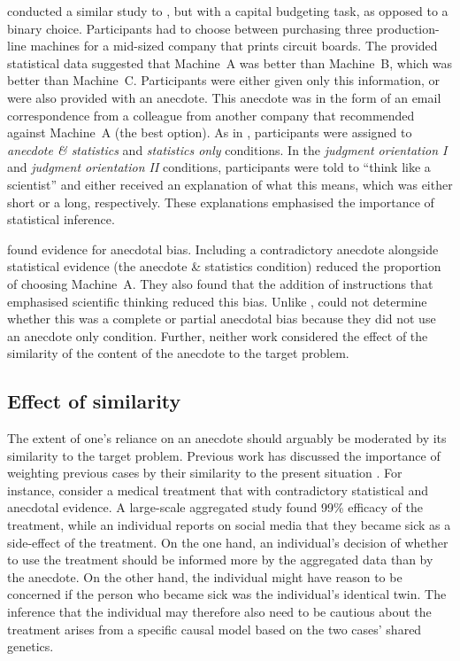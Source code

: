 \documentclass[a4paper, nobind, dvipsnames]{templates/ociamthesis}
\theoremstyle{definition}
\theoremstyle{definition}
\theoremstyle{definition}
\theoremstyle{definition}
\theoremstyle{remark}
\begin{document}
\textcite{wainberg2018} conducted a similar study to \textcite{wainberg2013}, but with a capital
budgeting task, as opposed to a binary choice. Participants had to choose
between purchasing three production-line machines for a mid-sized company that
prints circuit boards. The provided statistical data suggested that Machine~A
was better than Machine~B, which was better than Machine~C. Participants were
either given only this information, or were also provided with an anecdote. This
anecdote was in the form of an email correspondence from a colleague from
another company that recommended against Machine~A (the best option). As in
\textcite{wainberg2013}, participants were assigned to \emph{anecdote \& statistics} and
\emph{statistics only} conditions. In the \emph{judgment orientation I} and \emph{judgment
orientation II} conditions, participants were told to ``think like a scientist''
and either received an explanation of what this means, which was either short or
a long, respectively. These explanations emphasised the importance of
statistical inference.

\textcite{wainberg2018} found evidence for anecdotal bias. Including a contradictory
anecdote alongside statistical evidence (the anecdote \& statistics condition)
reduced the proportion of choosing Machine~A. They also found that the addition
of instructions that emphasised scientific thinking reduced this bias. Unlike
\textcite{wainberg2013}, \textcite{wainberg2018} could not determine whether this was a complete or
partial anecdotal bias because they did not use an anecdote only condition.
Further, neither work considered the effect of the similarity of the content of
the anecdote to the target problem.

\hypertarget{effect-of-similarity}{%
\subsection{Effect of similarity}\label{effect-of-similarity}}

The extent of one's reliance on an anecdote should arguably be moderated by its
similarity to the target problem. Previous work has discussed the importance of
weighting previous cases by their similarity to the present situation
\autocite{gilboa1995,lovallo2012}. For instance, consider a medical treatment that
with contradictory statistical and anecdotal evidence. A large-scale aggregated
study found 99\% efficacy of the treatment, while an individual reports on social
media that they became sick as a side-effect of the treatment. On the one hand,
an individual's decision of whether to use the treatment should be informed more
by the aggregated data than by the anecdote. On the other hand, the individual
might have reason to be concerned if the person who became sick was the
individual's identical twin. The inference that the individual may therefore
also need to be cautious about the treatment arises from a specific causal model
based on the two cases' shared genetics.
\end{document}
